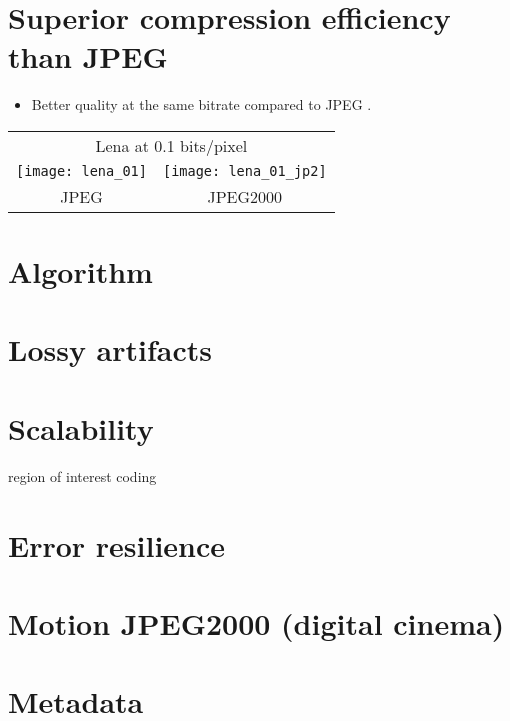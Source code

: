 \section{Superior compression efficiency than \gls{JPEG}}
\begin{itemize}
\item Better quality at the same bitrate compared to JPEG \cite{vruiz_J2K}.
\end{itemize}
\begin{center}
  \begin{tabular}{cc}
    \multicolumn{2}{c}{Lena at 0.1 bits/pixel} \\
    \texttt{[image: lena\_01]} & \texttt{[image: lena\_01\_jp2]} \\
    JPEG & JPEG2000
  \end{tabular}
\end{center}

\section{Algorithm}

\section{Lossy artifacts}

\section{Scalability}
region of interest coding

\section{Error resilience}

\section{Motion JPEG2000 (digital cinema)}

\section{Metadata}